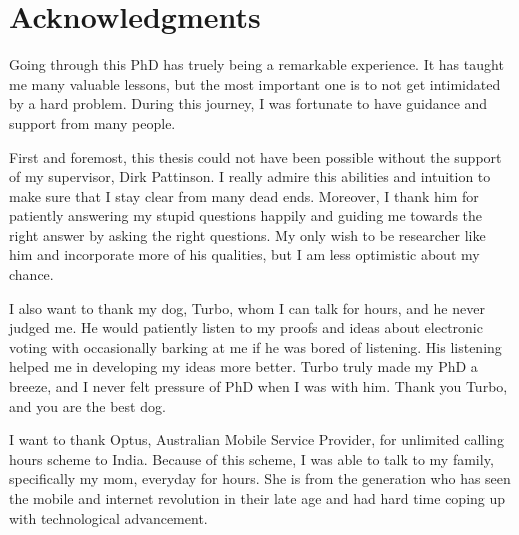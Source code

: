 \chapter*{Acknowledgments}
Going through this PhD has truely being a remarkable experience.  It has taught me many valuable lessons, 
but the most important one is to not get intimidated by a hard problem.  During this journey, I 
was fortunate to have guidance and support from many people. 	


First and foremost, this thesis could not have been possible without the support of my supervisor, Dirk Pattinson. I really 
admire this abilities and intuition to make sure that I stay clear from many dead ends. Moreover, 
I thank him for patiently answering my stupid questions happily and guiding me towards the right 
answer by asking the right questions. My only wish to be researcher like 
him and incorporate more of his qualities, but I am less optimistic about my chance. 

I also want to thank my dog, Turbo, whom I can talk for hours, and he never judged me. He 
would patiently listen to my proofs
and ideas about electronic voting with occasionally barking at me if he was bored of listening. 
His listening helped me in developing my ideas more better. 
Turbo truly made my PhD a breeze, and I never felt pressure of PhD when I was with him. Thank you
Turbo, and you are the best dog. 


I want to thank Optus, Australian Mobile Service Provider, for unlimited calling hours scheme to India. 
Because of this scheme, I was able to talk to my family, specifically my mom, everyday for hours. She is from the generation 
who has seen the mobile and internet revolution in their late age and had hard time coping up with
technological advancement. 
 
